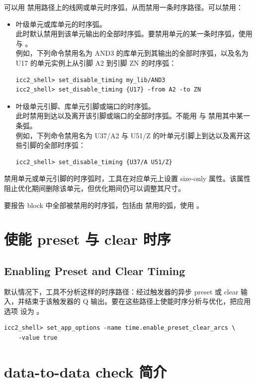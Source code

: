 可以用  禁用路径上的线网或单元时序弧，从而禁用一条时序路径。可以禁用：
\begin{itemize}
  \item 叶级单元或库单元的时序弧。\\
        此时默认禁用到该单元输出的全部时序弧。要禁用单元的某一条时序弧，使用  与 。\\
        例如，下列命令禁用名为 AND3 的库单元到其输出的全部时序弧，以及名为 U17 的单元实例上从引脚 A2 到引脚 ZN 的时序弧：
\begin{lstlisting}
icc2_shell> set_disable_timing my_lib/AND3
icc2_shell> set_disable_timing {U17} -from A2 -to ZN
\end{lstlisting}
  \item 叶级单元引脚、库单元引脚或端口的时序弧。\\
        此时禁用到达以及离开该引脚或端口的全部时序弧。不能用  与  禁用其中某一条弧。\\
        例如，下列命令禁用名为 U37/A2 与 U51/Z 的叶单元引脚上到达以及离开这些引脚的全部时序弧：
\begin{lstlisting}
icc2_shell> set_disable_timing {U37/A U51/Z}
\end{lstlisting}
\end{itemize}

禁用单元或单元引脚的时序弧时，工具在对应单元上设置 size-only 属性。该属性阻止优化期间删除该单元，但优化期间仍可以调整其尺寸。

要报告 block 中全部被禁用的时序弧，包括由  禁用的弧，使用 。

\section{使能 preset 与 clear 时序}
\subsection*{Enabling Preset and Clear Timing}

默认情况下，工具不分析这样的时序路径：经过触发器的异步 preset 或 clear 输入，并结束于该触发器的 Q 输出。要在这些路径上使能时序分析与优化，把应用选项  设为 。
\begin{lstlisting}
icc2_shell> set_app_options -name time.enable_preset_clear_arcs \
    -value true
\end{lstlisting}

\section{data-to-data check 简介}
